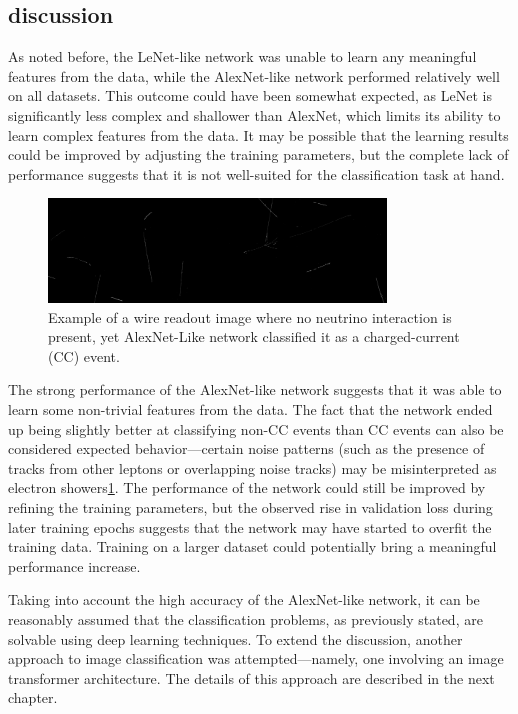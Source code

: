\documentclass{pracalicmgr}
\begin{document}
\newpage

\subsection{discussion}

As noted before, the LeNet-like network was unable to learn any meaningful features from the data, while the AlexNet-like network performed relatively well on all datasets. This outcome could have been somewhat expected, as LeNet is significantly less complex and shallower than AlexNet, which limits its ability to learn complex features from the data. It may be possible that the learning results could be improved by adjusting the training parameters, but the complete lack of performance suggests that it is not well-suited for the classification task at hand.

\begin{figure}[H]
    \centering
    \includegraphics[width=0.8\textwidth]{src/without_flag_20.png}
    \caption{Example of a wire readout image where no neutrino interaction is present, yet AlexNet-Like network classified it as a charged-current (CC) event.}
    \label{fig:without_flag}
\end{figure}

The strong performance of the AlexNet-like network suggests that it was able to learn some non-trivial features from the data.  The fact that the network ended up being slightly better at classifying non-CC events than CC events can also be considered expected behavior—certain noise patterns (such as the presence of tracks from other leptons or overlapping noise tracks) may be misinterpreted as electron showers\ref{fig:without_flag}. The performance of the network could still be improved by refining the training parameters, but the observed rise in validation loss during later training epochs suggests that the network may have started to overfit the training data. Training on a larger dataset could potentially bring a meaningful performance increase.

Taking into account the high accuracy of the AlexNet-like network, it can be reasonably assumed that the classification problems, as previously stated, are solvable using deep learning techniques. To extend the discussion, another approach to image classification was attempted—namely, one involving an image transformer architecture. The details of this approach are described in the next chapter.
\end{document}
